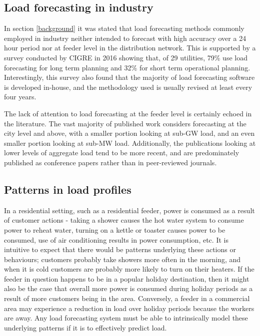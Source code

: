 \subsection{Load forecasting in industry}
In section \ref{background} it was stated that load forecasting methods commonly employed in industry neither intended to forecast with high accuracy over a 24 hour period nor at feeder level in the distribution network.
This is supported by a survey conducted by CIGRE in 2016 \citep{CIGRE2016} showing that, of 29 utilities, 79\% use load forecasting for long term planning and 32\% for short term operational planning.
Interestingly, this survey also found that the majority of load forecasting software is developed in-house, and the methodology used is usually revised at least every four years.

The lack of attention to load forecasting at the feeder level is certainly echoed in the literature.
The vast majority of published work considers forecasting at the city level and above, with a smaller portion looking at sub-GW load, and an even smaller portion looking at sub-MW load.
Additionally, the publications looking at lower levels of aggregate load tend to be more recent, and are predominately published as conference papers rather than in peer-reviewed journals.

\subsection{Patterns in load profiles}
\label{patterns-profiles}
In a residential setting, such as a residential feeder, power is consumed as a result of customer actions - taking a shower causes the hot water system to consume power to reheat water, turning on a kettle or toaster causes power to be consumed, use of air conditioning results in power consumption, etc.
It is intuitive to expect that there would be patterns underlying these actions or behaviours; customers probably take showers more often in the morning, and when it is cold customers are probably more likely to turn on their heaters.
If the feeder in question happens to be in a popular holiday destination, then it might also be the case that overall more power is consumed during holiday periods as a result of more customers being in the area.
Conversely, a feeder in a commercial area may experience a reduction in load over holiday periods because the workers are away.
Any load forecasting system must be able to intrinsically model these underlying patterns if it is to effectively predict load.

